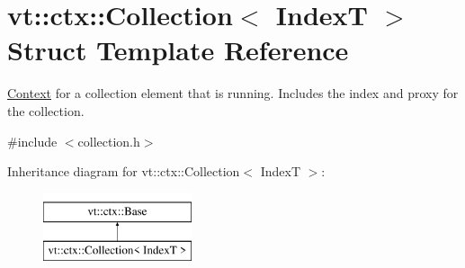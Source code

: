 \hypertarget{structvt_1_1ctx_1_1_collection}{}\section{vt\+:\+:ctx\+:\+:Collection$<$ IndexT $>$ Struct Template Reference}
\label{structvt_1_1ctx_1_1_collection}


\hyperlink{structvt_1_1ctx_1_1_context}{Context} for a collection element that is running. Includes the index and proxy for the collection.  




{\ttfamily \#include $<$collection.\+h$>$}

Inheritance diagram for vt\+:\+:ctx\+:\+:Collection$<$ IndexT $>$\+:\begin{figure}[H]
\begin{center}
\leavevmode
\includegraphics[height=2.000000cm]{structvt_1_1ctx_1_1_collection}
\end{center}
\end{figure}
